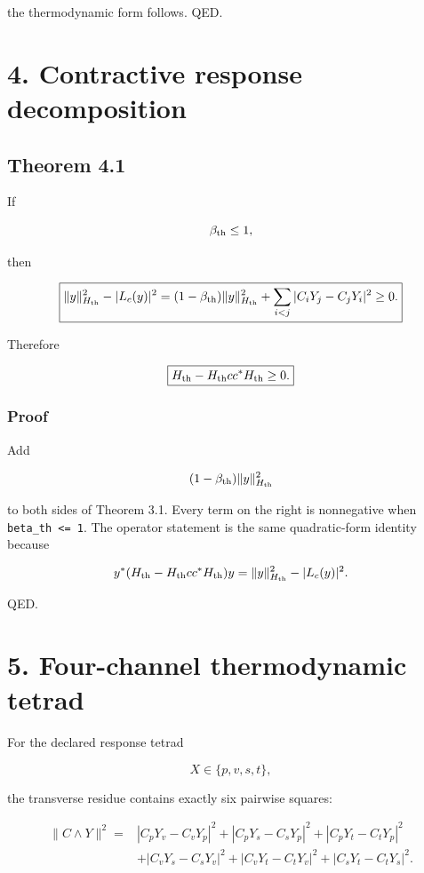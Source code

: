 the thermodynamic form follows. QED.

\hypertarget{contractive-response-decomposition}{%
\section{4. Contractive response decomposition}\label{contractive-response-decomposition}}

\hypertarget{theorem-4.1}{%
\subsection{Theorem 4.1}\label{theorem-4.1}}

If

\[
\beta_{\rm th}\le1,
\]

then

\[
\boxed{
\|y\|_{H_{\rm th}}^2-|L_c(y)|^2
=
(1-\beta_{\rm th})\|y\|_{H_{\rm th}}^2
+
\sum_{i<j}|C_iY_j-C_jY_i|^2
\ge0.
}
\]

Therefore

\[
\boxed{
H_{\rm th}-H_{\rm th}cc^*H_{\rm th}\ge0.
}
\]

\hypertarget{proof-1}{%
\subsubsection{Proof}\label{proof-1}}

Add

\[
(1-\beta_{\rm th})\|y\|_{H_{\rm th}}^2
\]

to both sides of Theorem 3.1. Every term on the right is nonnegative when \texttt{beta\_th\ \textless{}=\ 1}. The operator statement is the same quadratic-form identity because

\[
y^*(H_{\rm th}-H_{\rm th}cc^*H_{\rm th})y
=
\|y\|_{H_{\rm th}}^2-|L_c(y)|^2.
\]

QED.

\hypertarget{four-channel-thermodynamic-tetrad}{%
\section{5. Four-channel thermodynamic tetrad}\label{four-channel-thermodynamic-tetrad}}

For the declared response tetrad

\[
X\in\{p,v,s,t\},
\]

the transverse residue contains exactly six pairwise squares:

\[
\begin{aligned}
\|C\wedge Y\|^2={}&
|C_pY_v-C_vY_p|^2
+|C_pY_s-C_sY_p|^2
+|C_pY_t-C_tY_p|^2\\
&+|C_vY_s-C_sY_v|^2
+|C_vY_t-C_tY_v|^2
+|C_sY_t-C_tY_s|^2.
\end{aligned}
\]

